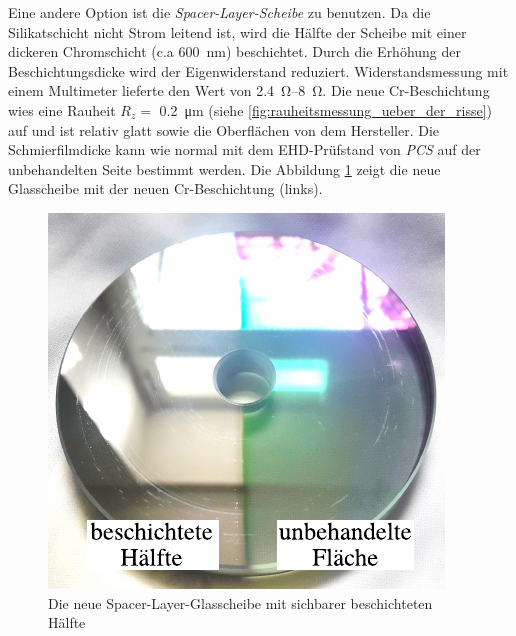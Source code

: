 Eine andere Option ist die \textit{Spacer-Layer-Scheibe} zu benutzen.
Da die Silikatschicht nicht Strom leitend ist, wird die Hälfte der Scheibe mit einer dickeren Chromschicht (c.a \SI{600}{\nano\meter}) beschichtet.
Durch die Erhöhung der Beschichtungsdicke wird der Eigenwiderstand reduziert.
Widerstandsmessung mit einem Multimeter lieferte den Wert von \SIrange{2.4}{8}{\ohm}.
Die neue Cr-Beschichtung wies eine Rauheit $R_z =$ \SI{0.2}{\um} (siehe \ref{fig:rauheitsmessung_ueber_der_risse}) auf und ist relativ glatt sowie die Oberflächen von dem Hersteller.
Die Schmierfilmdicke kann wie normal mit dem EHD-Prüfstand von \textit{PCS} auf der unbehandelten Seite bestimmt werden.
Die Abbildung \ref{fig:die_neu_beschichtet_glassscheibe} zeigt die neue Glasscheibe mit der neuen Cr-Beschichtung (links).
\begin{figure}[htb]
    \centering
    \includegraphics[]{./images/beschichtete_scheibe.pdf}
    \caption{Die neue Spacer-Layer-Glasscheibe mit sichbarer beschichteten Hälfte}
    \label{fig:die_neu_beschichtet_glassscheibe}
\end{figure}
%

